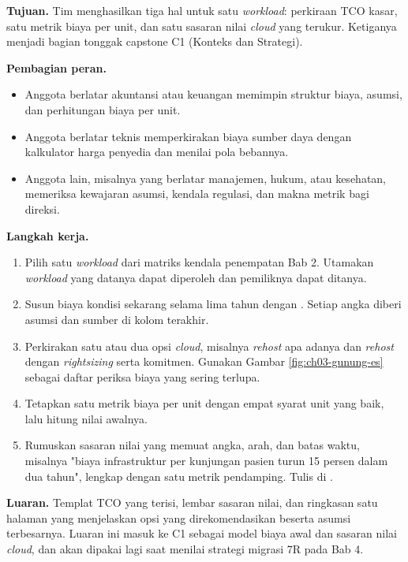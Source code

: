 \textbf{Tujuan.} Tim menghasilkan tiga hal untuk satu \textit{workload}: perkiraan TCO kasar, satu
metrik biaya per unit, dan satu sasaran nilai \textit{cloud} yang terukur. Ketiganya menjadi bagian
tonggak capstone C1 (Konteks dan Strategi).

\textbf{Pembagian peran.}
\begin{itemize}
  \item Anggota berlatar akuntansi atau keuangan memimpin struktur biaya, asumsi, dan perhitungan
        biaya per unit.
  \item Anggota berlatar teknis memperkirakan biaya sumber daya dengan kalkulator harga penyedia dan
        menilai pola bebannya.
  \item Anggota lain, misalnya yang berlatar manajemen, hukum, atau kesehatan, memeriksa kewajaran
        asumsi, kendala regulasi, dan makna metrik bagi direksi.
\end{itemize}

\textbf{Langkah kerja.}
\begin{enumerate}
  \item Pilih satu \textit{workload} dari matriks kendala penempatan Bab 2. Utamakan
        \textit{workload} yang datanya dapat diperoleh dan pemiliknya dapat ditanya.
  \item Susun biaya kondisi sekarang selama lima tahun dengan
        . Setiap angka diberi asumsi dan sumber
        di kolom terakhir.
  \item Perkirakan satu atau dua opsi \textit{cloud}, misalnya \textit{rehost} apa adanya dan
        \textit{rehost} dengan \textit{rightsizing} serta komitmen. Gunakan Gambar
        \ref{fig:ch03-gunung-es} sebagai daftar periksa biaya yang sering terlupa.
  \item Tetapkan satu metrik biaya per unit dengan empat syarat unit yang baik, lalu hitung nilai
        awalnya.
  \item Rumuskan sasaran nilai yang memuat angka, arah, dan batas waktu, misalnya "biaya
        infrastruktur per kunjungan pasien turun 15 persen dalam dua tahun", lengkap dengan satu
        metrik pendamping. Tulis di .
\end{enumerate}

\textbf{Luaran.} Templat TCO yang terisi, lembar sasaran nilai, dan ringkasan satu halaman yang
menjelaskan opsi yang direkomendasikan beserta asumsi terbesarnya. Luaran ini masuk ke C1 sebagai
model biaya awal dan sasaran nilai \textit{cloud}, dan akan dipakai lagi saat menilai strategi
migrasi 7R pada Bab 4.

